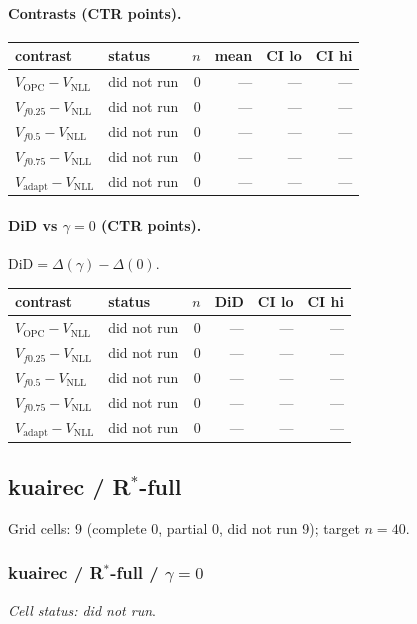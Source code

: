 \documentclass[10pt,a4paper]{article}
\begin{document}
\paragraph{Contrasts (CTR points).}
{\centering\small\begin{tabular}{llrrrr}
\toprule contrast & status & $n$ & mean & CI lo & CI hi \\
\midrule
$V_{\mathrm{OPC}}-V_{\mathrm{NLL}}$ & did not run & 0 & --- & --- & --- \\
$V_{f0.25}-V_{\mathrm{NLL}}$ & did not run & 0 & --- & --- & --- \\
$V_{f0.5}-V_{\mathrm{NLL}}$ & did not run & 0 & --- & --- & --- \\
$V_{f0.75}-V_{\mathrm{NLL}}$ & did not run & 0 & --- & --- & --- \\
$V_{\mathrm{adapt}}-V_{\mathrm{NLL}}$ & did not run & 0 & --- & --- & --- \\
\bottomrule\end{tabular}\par}
\paragraph{DiD vs $\gamma=0$ (CTR points).} $\mathrm{DiD}=\Delta(\gamma)-\Delta(0)$.
{\centering\small\begin{tabular}{llrrrr}
\toprule contrast & status & $n$ & DiD & CI lo & CI hi \\
\midrule
$V_{\mathrm{OPC}}-V_{\mathrm{NLL}}$ & did not run & 0 & --- & --- & --- \\
$V_{f0.25}-V_{\mathrm{NLL}}$ & did not run & 0 & --- & --- & --- \\
$V_{f0.5}-V_{\mathrm{NLL}}$ & did not run & 0 & --- & --- & --- \\
$V_{f0.75}-V_{\mathrm{NLL}}$ & did not run & 0 & --- & --- & --- \\
$V_{\mathrm{adapt}}-V_{\mathrm{NLL}}$ & did not run & 0 & --- & --- & --- \\
\bottomrule\end{tabular}\par}
\bigskip
\newpage
\subsection{kuairec / R$^*$-full}
Grid cells: 9 (complete 0, partial 0, did not run 9); target $n=40$.
\subsubsection{kuairec / R$^*$-full / $\gamma=0$}
\emph{Cell status: did not run}.
\end{document}
